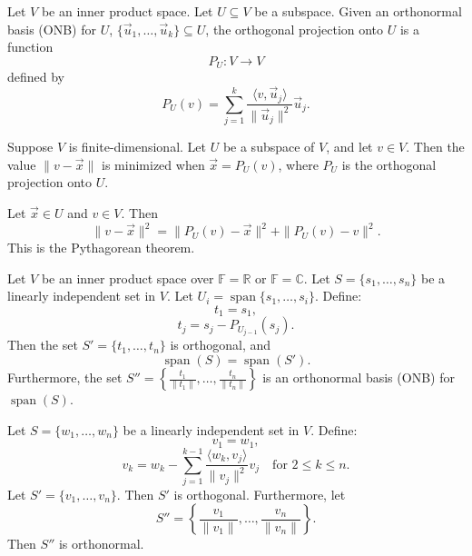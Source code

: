 \documentclass{article}
\newcommand{\R}{\mathbb{R}}
\newcommand{\C}{\mathbb{C}}
\newcommand{\F}{\mathbb{F}}
\begin{document}
\begin{definition}
    Let \( V \) be an inner product space. Let \( U \subseteq V \) be a subspace. Given an orthonormal basis (ONB) for \( U \), \(\{ \vec{u}_1, \ldots, \vec{u}_k \} \subseteq U\), the orthogonal projection onto \( U \) is a function
    \[
    P_U : V \to V
    \]
    defined by
    \[
    P_U(v) = \sum_{j=1}^{k} \frac{\langle v, \vec{u}_j \rangle}{\| \vec{u}_j \|^2} \vec{u}_j.
    \]
\end{definition}


\begin{proposition}
    Suppose \( V \) is finite-dimensional. Let \( U \) be a subspace of \( V \), and let \( v \in V \). Then the value \(\| v - \vec{x} \|\) is minimized when \( \vec{x} = P_U(v) \), where \( P_U \) is the orthogonal projection onto \( U \).
\end{proposition}


\begin{lemma}
    Let \( \vec{x} \in U \) and \( v \in V \). Then
    \[
    \| v - \vec{x} \|^2 = \| P_U(v) - \vec{x} \|^2 + \| P_U(v) - v \|^2.
    \]
    This is the Pythagorean theorem.
\end{lemma}




\begin{theorem}
    Let \( V \) be an inner product space over \( \F = \R \) or \( \F = \C \). Let \( S = \{ s_1, \ldots, s_n \} \) be a linearly independent set in \( V \). Let \( U_i = \operatorname{span} \{ s_1, \ldots, s_i \} \). Define:
    \[
    t_1 = s_1,
    \]
    \[
    t_j = s_j - P_{U_{j-1}}(s_j).
    \]
    Then the set \( S' = \{ t_1, \ldots, t_n \} \) is orthogonal, and
    \[
    \operatorname{span}(S) = \operatorname{span}(S').
    \]
    Furthermore, the set \( S'' = \left\{ \frac{t_1}{\| t_1 \|}, \ldots, \frac{t_n}{\| t_n \|} \right\} \) is an orthonormal basis (ONB) for \(\operatorname{span}(S)\).
\end{theorem}


\begin{theorem}
    Let \( S = \{ w_1, \ldots, w_n \} \) be a linearly independent set in \( V \). Define:
    \[
    v_1 = w_1,
    \]
    \[
    v_k = w_k - \sum_{j=1}^{k-1} \frac{\langle w_k, v_j \rangle}{\| v_j \|^2} v_j \quad \text{for } 2 \leq k \leq n.
    \]
    Let \( S' = \{ v_1, \ldots, v_n \} \). Then \( S' \) is orthogonal. Furthermore, let
    \[
    S'' = \left\{ \frac{v_1}{\| v_1 \|}, \ldots, \frac{v_n}{\| v_n \|} \right\}.
    \]
    Then \( S'' \) is orthonormal.
\end{theorem}
\end{document}
